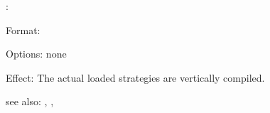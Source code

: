 :

Format: 

Options: none

Effect:	The actual loaded strategies are vertically compiled.

see also: , , 
